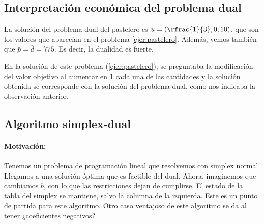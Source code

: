 \subsection{Interpretación económica del problema dual}

La solución del problema dual del pastelero es $u = \left(\rfrac{1}{3},0,10\right)$, que son los valores que aparecían en el problema \ref{ejer:pastelero}. Además, vemos también que $\bar{p} = \bar{d} = 775$. Es decir, la dualidad es fuerte. 


En la solución de este problema (\ref{ejer:pastelero}), se preguntaba la modificación del valor objetivo al aumentar en 1 cada una de las cantidades y la solución obtenida se corresponde con la solución del problema dual,
como nos indicaba la observación anterior.


\subsection{Algoritmo simplex-dual}

\paragraph{Motivación:} 
Tenemos un problema de programación lineal que resolvemos con simplex normal. 
Llegamos a una solución óptima que es factible del dual. Ahora, imaginemos que cambiamos $b$, con lo que las restricciones dejan de cumplirse. El estado de la tabla del simplex se mantiene, salvo la columna de la izquierda. 
Este es un punto de partida para este algoritmo. Otro caso ventajoso de este algoritmo se da al tener ¿coeficientes negativos?





